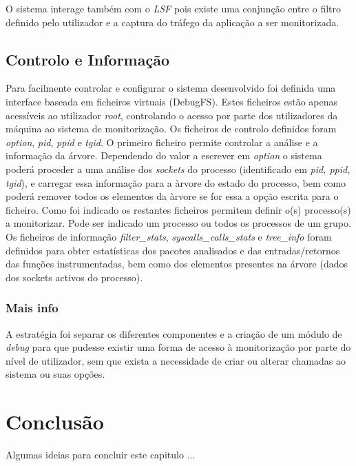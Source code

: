 O sistema interage também com o \textit{LSF} pois existe uma conjunção entre o filtro definido pelo utilizador e a captura do tráfego da aplicação a ser monitorizada.


\subsection*{Controlo e Informação}
\label{sub:data_information}

Para facilmente controlar e configurar o sistema desenvolvido foi definida uma interface baseada em ficheiros virtuais (DebugFS).
 Estes ficheiros estão apenas acessíveis ao utilizador \textit{root}, controlando o acesso por parte dos utilizadores da máquina ao sistema de monitorização.
 Os ficheiros de controlo definidos foram \textit{option}, \textit{pid}, \textit{ppid} e \textit{tgid}.
 O primeiro ficheiro permite controlar a análise e a informação da árvore.
 Dependendo do valor a escrever em \textit{option} o sistema poderá proceder a uma análise dos \textit{sockets} do processo (identificado em \textit{pid, ppid, tgid}), e carregar essa informação para a àrvore do estado do processo, bem como poderá remover todos os elementos da àrvore se for essa a opção escrita para o ficheiro.
 Como foi indicado os restantes ficheiros permitem definir o(s) processo(s) a monitorizar.
 Pode ser indicado um processo ou todos os processos de um grupo.
 Os ficheiros de informação \textit{filter\_stats}, \textit{syscalls\_calls\_stats} e \textit{tree\_info} foram definidos para obter estatísticas dos pacotes analisados e das entradas/retornos das funções instrumentadas, bem como dos elementos presentes na árvore (dados dos sockets activos do processo).

\subsubsection*{Mais info}
A estratégia foi separar os diferentes componentes e a criação de um módulo de \textit{debug} para que pudesse existir uma forma de acesso à monitorização por parte do nível de utilizador, sem que exista a necessidade de criar ou alterar chamadas ao sistema ou suas opções.



\section{Conclusão}

Algumas ideias para concluir este capitulo ...

